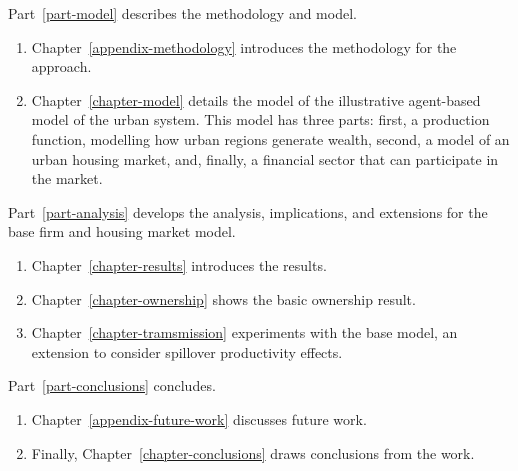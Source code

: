 \noindent Part~\ref{part-model} describes the methodology and model.

\begin{enumerate}
    \item Chapter~\ref{appendix-methodology} introduces the methodology for the approach. 

    \item Chapter~\ref{chapter-model} details the model of the illustrative agent-based model of the urban system. This model has three  parts: first, a production function, modelling how urban regions generate wealth,  second, a model of an urban housing market, and, finally, a financial sector that can participate in the market. 
\end{enumerate}

\noindent Part~\ref{part-analysis} develops the analysis, implications, and extensions for the base firm and housing market model.

\begin{enumerate}
    \item Chapter~\ref{chapter-results} introduces the results.
    \item Chapter~\ref{chapter-ownership} shows the basic ownership result.
    \item Chapter~\ref{chapter-tramsmission} experiments  with the base model, an extension to consider spillover productivity effects.
\end{enumerate}

\noindent Part~\ref{part-conclusions} %
concludes. 

\begin{enumerate}
    \item Chapter~\ref{appendix-future-work} discusses future work. 
    \item Finally, Chapter~\ref{chapter-conclusions} draws conclusions from the work.
\end{enumerate}

% 
